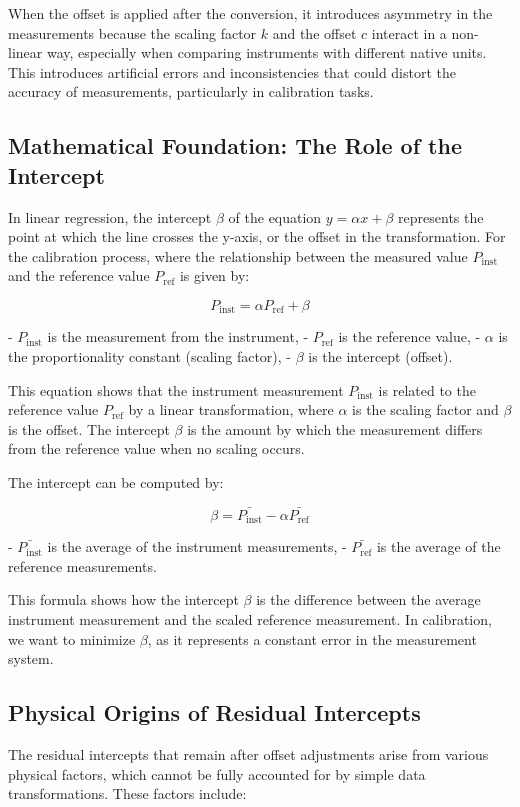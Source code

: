 \documentclass{article}
\begin{document}
When the offset is applied after the conversion, it introduces asymmetry in the measurements because the scaling factor \( k \) and the offset \( c \) interact in a non-linear way, especially when comparing instruments with different native units. This introduces artificial errors and inconsistencies that could distort the accuracy of measurements, particularly in calibration tasks. 

\subsection{Mathematical Foundation: The Role of the Intercept}
In linear regression, the intercept \( \beta \) of the equation \( y = \alpha x + \beta \) represents the point at which the line crosses the y-axis, or the offset in the transformation. For the calibration process, where the relationship between the measured value \( P_{\text{inst}} \) and the reference value \( P_{\text{ref}} \) is given by:

\[
P_{\text{inst}} = \alpha P_{\text{ref}} + \beta
\]

- \( P_{\text{inst}} \) is the measurement from the instrument,
- \( P_{\text{ref}} \) is the reference value,
- \( \alpha \) is the proportionality constant (scaling factor),
- \( \beta \) is the intercept (offset).

This equation shows that the instrument measurement \( P_{\text{inst}} \) is related to the reference value \( P_{\text{ref}} \) by a linear transformation, where \( \alpha \) is the scaling factor and \( \beta \) is the offset. The intercept \( \beta \) is the amount by which the measurement differs from the reference value when no scaling occurs.

The intercept can be computed by:

\[
\beta = \bar{P_{\text{inst}}} - \alpha \bar{P_{\text{ref}}}
\]

- \( \bar{P_{\text{inst}}} \) is the average of the instrument measurements,
- \( \bar{P_{\text{ref}}} \) is the average of the reference measurements.

This formula shows how the intercept \( \beta \) is the difference between the average instrument measurement and the scaled reference measurement. In calibration, we want to minimize \( \beta \), as it represents a constant error in the measurement system.

\subsection{Physical Origins of Residual Intercepts}
The residual intercepts that remain after offset adjustments arise from various physical factors, which cannot be fully accounted for by simple data transformations. These factors include:
\end{document}
